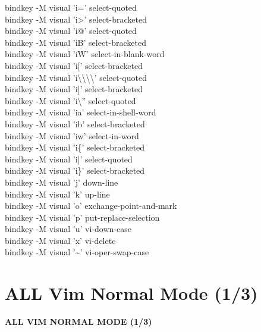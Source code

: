\documentclass[11pt,a4paper,twoside]{book}
\begin{document}
bindkey -M visual 'i=' select-quoted\\
bindkey -M visual 'i>' select-bracketed\\
bindkey -M visual 'i@' select-quoted\\
bindkey -M visual 'iB' select-bracketed\\
bindkey -M visual 'iW' select-in-blank-word\\
bindkey -M visual 'i[' select-bracketed\\
bindkey -M visual 'i\textbackslash{}\textbackslash{}\textbackslash{}\textbackslash{}' select-quoted\\
bindkey -M visual 'i]' select-bracketed\\
bindkey -M visual 'i\textbackslash{}'' select-quoted\\
bindkey -M visual 'ia' select-in-shell-word\\
bindkey -M visual 'ib' select-bracketed\\
bindkey -M visual 'iw' select-in-word\\
bindkey -M visual 'i\{' select-bracketed\\
bindkey -M visual 'i|' select-quoted\\
bindkey -M visual 'i\}' select-bracketed\\
bindkey -M visual 'j' down-line\\
bindkey -M visual 'k' up-line\\
bindkey -M visual 'o' exchange-point-and-mark\\
bindkey -M visual 'p' put-replace-selection\\
bindkey -M visual 'u' vi-down-case\\
bindkey -M visual 'x' vi-delete\\
bindkey -M visual '\textasciitilde{}' vi-oper-swap-case\\


\vspace{16pt}

\section{ALL Vim Normal Mode (1/3)}


\vspace{10pt}
{\large\bfseries\color{neoncyan} ALL VIM NORMAL MODE (1/3)}\vspace{6pt}
\end{document}
